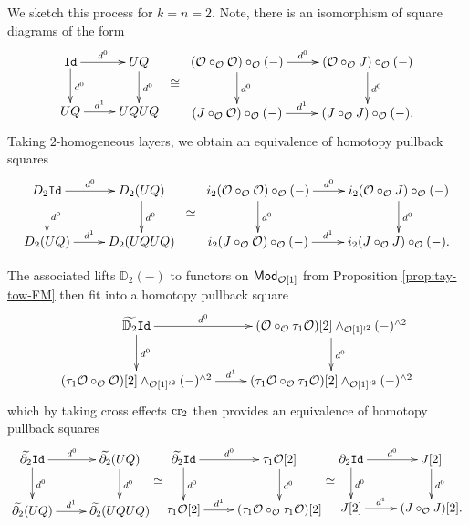 \begin{example} \label{ex:C(O)} We sketch this process for $k=n=2$. Note, there is an isomorphism of square diagrams of the form \[ 
    \xymatrix{ \Id \ar[r]^-{d^0} \ar[d]^-{d^0} & UQ \ar[d]^-{d^0} \\ UQ \ar[r]^-{d^1} & UQUQ } \;\; \raisebox{-4ex}{$\cong$} \;\; 
    \xymatrix{ (\Cal{O} \circ_{\Cal{O}} \Cal{O}) \circ_{\Cal{O}} (-) \ar[r]^-{d^0} \ar[d]^-{d^0} &
        (\Cal{O} \circ_{\Cal{O}} J) \circ_{\Cal{O}} (-) \ar[d]^-{d^0} \\
        (J \circ_{\Cal{O}} \Cal{O}) \circ_{\Cal{O}} (-) \ar[r]^-{d^1} &
        (J \circ_{\Cal{O}} J)\circ_{\Cal{O}} (-).}\]
Taking $2$-homogeneous layers, we obtain an equivalence of homotopy pullback squares
\[ 
    \xymatrix{ D_2\Id \ar[r]^-{d^0} \ar[d]^-{d^0} & D_2(UQ) \ar[d]^-{d^0} \\ D_2(UQ) \ar[r]^-{d^1} & D_2(UQUQ) } \;\; \raisebox{-4ex}{$\simeq$} \;\; 
    \xymatrix{ i_2(\Cal{O} \circ_{\Cal{O}} \Cal{O}) \circ_{\Cal{O}} (-) \ar[r]^-{d^0} \ar[d]^-{d^0} &
        i_2(\Cal{O} \circ_{\Cal{O}} J) \circ_{\Cal{O}} (-) \ar[d]^-{d^0} \\
        i_2(J \circ_{\Cal{O}} \Cal{O}) \circ_{\Cal{O}} (-) \ar[r]^-{d^1} &
        i_2(J \circ_{\Cal{O}} J)\circ_{\Cal{O}} (-).}\]

The associated lifts $\widetilde{\mathbb{D}_2}(-)$ to functors on $\mathsf{Mod}_{\mathcal{O}[1]}$ from Proposition \ref{prop:tay-tow-FM} then fit into a homotopy pullback square
\[ 
    \xymatrix{ 
        \widetilde{\mathbb{D}_2}\Id \ar[r]^-{d^0} \ar[d]^-{d^0} & 
        (\Cal{O}\circ_{\Cal{O}} \tau_1 \Cal{O})[2] \wedge_{\Cal{O}[1]^{\wr 2}} (-)^{\wedge 2} \ar[d]^-{d^0} \\
        (\tau_1 \Cal{O} \circ_{\Cal{O}} \Cal{O})[2] \wedge_{\Cal{O}[1]^{\wr 2}} (-)^{\wedge 2} \ar[r]^-{d^1} &
        (\tau_1 \Cal{O} \circ_{\Cal{O}} \tau_1 \Cal{O} )[2] \wedge_{\Cal{O}[1]^{\wr 2}} (-)^{\wedge 2}  }\]
which by taking cross effects $\operatorname{cr}_2$ then provides an equivalence of homotopy pullback squares 
\[ 
    \xymatrix{ \widetilde{\partial_2}\Id \ar[r]^-{d^0} \ar[d]^-{d^0} & \widetilde{\partial_2} (UQ) \ar[d]^-{d^0} \\ \widetilde{\partial_2}(UQ) \ar[r]^-{d^1} & \widetilde{\partial_2} (UQUQ) }  \raisebox{-4ex}{$\simeq$}  
    \xymatrix{ \widetilde{\partial_2} \Id \ar[d]^-{d^0} \ar[r]^-{d^0} &
        \tau_1 \Cal{O}[2] \ar[d]^-{d^0} \\
        \tau_1 \Cal{O} [2]\ar[r]^-{d^1} &
        (\tau_1\Cal{O} \circ_{\Cal{O}} \tau_1\Cal{O})[2]}
        \raisebox{-4ex}{$\simeq$} 
    \xymatrix{ \partial_2 \Id \ar[d]^-{d^0} \ar[r]^-{d^0} &
        J[2] \ar[d]^-{d^0} \\
        J[2]\ar[r]^-{d^1} &
        (J\circ_{\Cal{O}} J)[2].}\]
\end{example}

